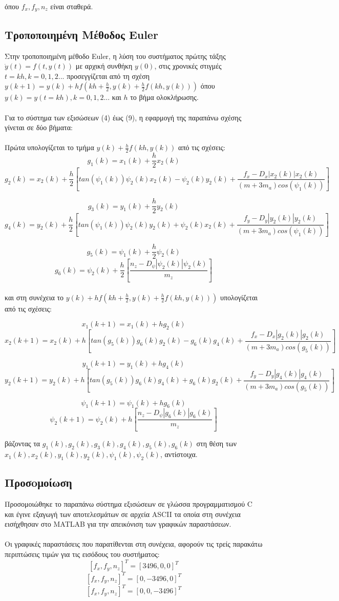 \documentclass{article}
\begin{document}
όπου \(f_x, f_y, n_z\) είναι σταθερά.

\subsection{Τροποποιημένη Μέθοδος Euler}
Στην τροποποιημένη μέθοδο Euler, η λύση του συστήματος πρώτης τάξης \(\dot{y}(t) = f(t, y(t))\) με αρχική συνθήκη \(y(0)\), στις χρονικές στιγμές \(t = kh, k = 0, 1, 2...\) προσεγγίζεται από τη σχέση \(y(k+1) = y(k) + hf(kh + \frac{h}{2}, y(k) + \frac{h}{2}f(kh, y(k)))\) όπου \(y(k) = y(t = kh), k = 0, 1, 2...\) και \(h\) το βήμα ολοκλήρωσης.
\\\\
Για το σύστημα των εξισώσεων (4) έως (9), η εφαρμογή της παραπάνω σχέσης γίνεται σε δύο βήματα:
\\\\
Πρώτα υπολογίζεται το τμήμα \(y(k) + \frac{h}{2}f(kh, y(k))\) από τις σχέσεις: 
\[g_1(k) = x_1(k) + \frac{h}{2}x_2(k)\]
\[g_2(k) = x_2(k) + \frac{h}{2}[tan(\psi_1(k))\psi_2(k)x_2(k) - \psi_2(k)y_2(k) + \frac{f_x - D_x|x_2(k)|x_2(k)}{(m + 3m_a)cos(\psi_1(k))}]\]

\[ g_3(k)   = y_1(k) + \frac{h}{2}y_2(k)   \]
\[g_4(k) = y_2(k) + \frac{h}{2}[tan(\psi_1(k))\psi_2(k)y_2(k) + \psi_2(k)x_2(k) + \frac{f_y - D_y|y_2(k)|y_2(k)}{(m + 3m_a)cos(\psi_1(k))}]\]


\[ g_5(k)   = \psi_1(k) + \frac{h}{2}\psi_2(k)   \]
\[ g_6(k) = \psi_2(k) + \frac{h}{2}[\frac{n_z - D_\psi|\psi_2(k)|\psi_2(k)}{m_z}]\]
\\
και στη συνέχεια το \(y(k) + hf(kh + \frac{h}{2}, y(k) + \frac{h}{2}f(kh, y(k)))\) υπολογίζεται από τις σχέσεις:

\[x_1(k+1) = x_1(k) + hg_2(k)\]
\[x_2(k+1) = x_2(k) + h[tan(g_5(k))g_6(k)g_2(k) - g_6(k)g_4(k) + \frac{f_x - D_x|g_2(k)|g_2(k)}{(m + 3m_a)cos(g_5(k))}]\]

\[ y_1(k+1)   = y_1(k) + hg_4(k)   \]
\[y_2(k+1) = y_2(k) + h[tan(g_5(k))g_6(k)g_4(k) + g_6(k)g_2(k) + \frac{f_y - D_y|g_4(k)|g_4(k)}{(m + 3m_a)cos(g_5(k))}]\]


\[ \psi_1(k+1)   = \psi_1(k) + hg_6(k)   \]
\[ \psi_2(k+1) = \psi_2(k) + h[\frac{n_z - D_\psi|g_6(k)|g_6(k)}{m_z}]\]

βάζοντας τα \(g_1(k), g_2(k), g_3(k), g_4(k), g_5(k), g_6(k)\) στη θέση των \(x_1(k), x_2(k), y_1(k), y_2(k), \psi_1(k), \psi_2(k)\), αντίστοιχα.

\subsection{Προσoμοίωση}
Προσομοιώθηκε το παραπάνω σύστημα εξισώσεων σε γλώσσα προγραμματισμού C και έγινε εξαγωγή των αποτελεσμάτων σε αρχεία ASCII τα οποία στη συνέχεια εισήχθησαν στο MATLAB για την απεικόνιση των γραφικών παραστάσεων.
\\\\
Οι γραφικές παραστάσεις που παρατίθενται στη συνέχεια, αφορούν τις τρείς παρακάτω περιπτώσεις τιμών για τις εισόδους του συστήματος:
\[[f_x, f_y, n_z]^T = [3496, 0, 0]^T\]
\[[f_x, f_y, n_z]^T = [0, -3496, 0]^T\]
\[[f_x, f_y, n_z]^T = [0, 0, -3496]^T\] 
 
\end{document}
